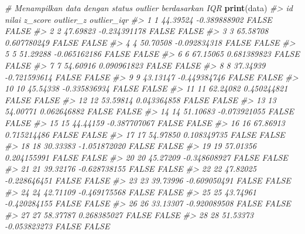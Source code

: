 \documentclass[
  oneside]{book}
\newenvironment{Shaded}{\begin{snugshade}}{\end{snugshade}}
\newcommand{\CommentTok}[1]{\textcolor[rgb]{0.56,0.35,0.01}{\textit{#1}}}
\newcommand{\FunctionTok}[1]{\textcolor[rgb]{0.13,0.29,0.53}{\textbf{#1}}}
\newcommand{\NormalTok}[1]{#1}
\begin{document}
\begin{Shaded}
\begin{Highlighting}[]
\CommentTok{\# Menampilkan data dengan status outlier berdasarkan IQR}
\FunctionTok{print}\NormalTok{(data)}
\CommentTok{\#\textgreater{}      id     nilai      z\_score outlier\_z outlier\_iqr}
\CommentTok{\#\textgreater{} 1     1  44.39524 {-}0.389888902     FALSE       FALSE}
\CommentTok{\#\textgreater{} 2     2  47.69823 {-}0.234391178     FALSE       FALSE}
\CommentTok{\#\textgreater{} 3     3  65.58708  0.607780249     FALSE       FALSE}
\CommentTok{\#\textgreater{} 4     4  50.70508 {-}0.092834318     FALSE       FALSE}
\CommentTok{\#\textgreater{} 5     5  51.29288 {-}0.065162186     FALSE       FALSE}
\CommentTok{\#\textgreater{} 6     6  67.15065  0.681389823     FALSE       FALSE}
\CommentTok{\#\textgreater{} 7     7  54.60916  0.090961823     FALSE       FALSE}
\CommentTok{\#\textgreater{} 8     8  37.34939 {-}0.721593614     FALSE       FALSE}
\CommentTok{\#\textgreater{} 9     9  43.13147 {-}0.449384746     FALSE       FALSE}
\CommentTok{\#\textgreater{} 10   10  45.54338 {-}0.335836934     FALSE       FALSE}
\CommentTok{\#\textgreater{} 11   11  62.24082  0.450244821     FALSE       FALSE}
\CommentTok{\#\textgreater{} 12   12  53.59814  0.043364858     FALSE       FALSE}
\CommentTok{\#\textgreater{} 13   13  54.00771  0.062646882     FALSE       FALSE}
\CommentTok{\#\textgreater{} 14   14  51.10683 {-}0.073921055     FALSE       FALSE}
\CommentTok{\#\textgreater{} 15   15  44.44159 {-}0.387707067     FALSE       FALSE}
\CommentTok{\#\textgreater{} 16   16  67.86913  0.715214486     FALSE       FALSE}
\CommentTok{\#\textgreater{} 17   17  54.97850  0.108349735     FALSE       FALSE}
\CommentTok{\#\textgreater{} 18   18  30.33383 {-}1.051872020     FALSE       FALSE}
\CommentTok{\#\textgreater{} 19   19  57.01356  0.204155991     FALSE       FALSE}
\CommentTok{\#\textgreater{} 20   20  45.27209 {-}0.348608927     FALSE       FALSE}
\CommentTok{\#\textgreater{} 21   21  39.32176 {-}0.628738155     FALSE       FALSE}
\CommentTok{\#\textgreater{} 22   22  47.82025 {-}0.228646451     FALSE       FALSE}
\CommentTok{\#\textgreater{} 23   23  39.73996 {-}0.609050491     FALSE       FALSE}
\CommentTok{\#\textgreater{} 24   24  42.71109 {-}0.469175568     FALSE       FALSE}
\CommentTok{\#\textgreater{} 25   25  43.74961 {-}0.420284155     FALSE       FALSE}
\CommentTok{\#\textgreater{} 26   26  33.13307 {-}0.920089508     FALSE       FALSE}
\CommentTok{\#\textgreater{} 27   27  58.37787  0.268385027     FALSE       FALSE}
\CommentTok{\#\textgreater{} 28   28  51.53373 {-}0.053823273     FALSE       FALSE}

\end{Highlighting}
\end{Shaded}
\end{document}
